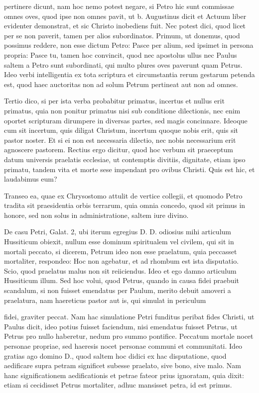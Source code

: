 pertinere dicunt, nam hoc nemo potest negare, si Petro hic sunt commissae omnes oves, quod ipse non omnes pavit, ut b. Augustinus dicit et Actuum liber evidenter demonstrat, et sic Christo inobediens fuit. Nec potest dici, quod licet per se non paverit, tamen per alios subordinatos. Primum, ut donemus, quod possimus reddere, non esse dictum Petro: Pasce per alium, sed ipsimet in persona propria: Pasce tu, tamen hoc convincit, quod nec apostolus ullus nec Paulus saltem a Petro sunt subordinati, qui multo plures oves \marginpar{\small[302]} paverunt quam Petrus. Ideo verbi intelligentia ex tota scriptura et circumstantia rerum gestarum petenda est, quod haec auctoritas non ad solum Petrum pertineat aut non ad omnes.

Tertio dico, si per ista verba probabitur primatus, incertus et nullus erit primatus, quia non ponitur primatus nisi sub conditione dilectionis, nec enim oportet scripturam dirumpere in diversas partes, sed magis concinnare. Ideoque cum sit incertum, quis diligat Christum, incertum quoque nobis erit, quis sit pastor noster. Et si ei non est necessaria dilectio, nec nobis necessarium erit agnoscere pastorem. Rectius ergo dicitur, quod hoc verbum sit praeceptum datum universis praelatis ecclesiae, ut contemptis divitiis, dignitate, etiam ipso primatu, tandem vita et morte sese impendant pro ovibus Christi. Quis est hic, et laudabimus eum?

Transeo ea, quae ex Chrysostomo attulit de vertice collegii, et quomodo Petro tradita sit praesidentia orbis terrarum, quia omnia concedo, quod sit primus in honore, sed non solus in administratione, saltem iure divino.

De casu Petri, Galat. 2, ubi iterum egregius D. D. odiosius mihi articulum Hussiticum obiexit, nullum esse dominum spiritualem vel civilem, qui sit in mortali peccato, si dicerem, Petrum ideo non esse praelatum, quia peccasset mortaliter, respondeo: Hoc non agebatur, et ad rhombum est ista disputatio. Scio, quod praelatus malus non sit reiiciendus. Ideo et ego damno articulum Hussiticum illum. Sed hoc volui, quod Petrus, quando in causa fidei praebuit scandalum, si non fuisset emendatus per Paulum, merito debuit amoveri a praelatura, nam haereticus pastor aut is, qui simulat in periculum

fidei, graviter peccat. Nam hac simulatione Petri funditus peribat fides Christi, ut Paulus dicit, ideo potius fuisset faciendum, nisi emendatus fuisset Petrus, ut Petrus pro nullo haberetur, nedum pro summo pontifice. Peccatum mortale nocet personae propriae, sed haeresis nocet personae communi et communitati. Ideo gratias ago domino D., quod saltem hoc didici ex hac disputatione, quod aedificare supra petram significet subesse praelato, sive bono, sive malo. Nam hanc significationem aedificationis et petrae fateor prius ignoratam, quia dixit: etiam si cecidisset Petrus mortaliter, adhuc mansisset petra, id est primus.


